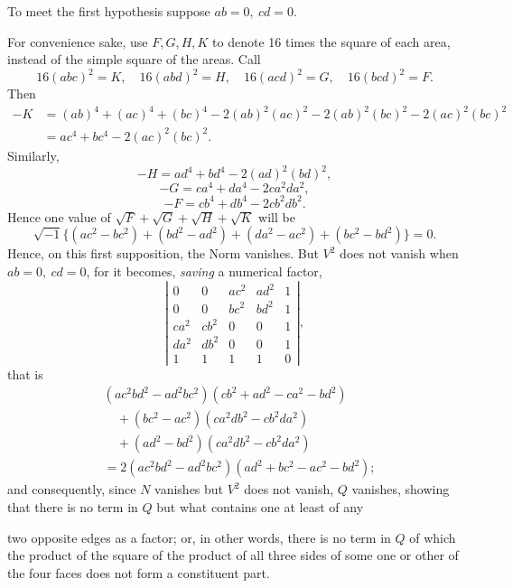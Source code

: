 \documentclass[11pt]{article}
\newcommand{\sourcepage}[1]{\marginpar{\scriptsize p.~#1}}
\begin{document}
{{To meet the first hypothesis suppose $ab=0,\ cd=0$.

For convenience sake, use $F,G,H,K$ to denote 16 times the square of each area, instead of the simple square of the areas. Call
\[
16(abc)^2=K,\quad 16(abd)^2=H,\quad 16(acd)^2=G,\quad 16(bcd)^2=F.
\]
Then
\[
\begin{aligned}
-K&=(ab)^4+(ac)^4+(bc)^4-2(ab)^2(ac)^2-2(ab)^2(bc)^2-2(ac)^2(bc)^2\\
&=ac^4+bc^4-2(ac)^2(bc)^2.
\end{aligned}
\]
Similarly,
\[
-H=ad^4+bd^4-2(ad)^2(bd)^2,
\]
\[
-G=ca^4+da^4-2ca^2da^2,
\]
\[
-F=cb^4+db^4-2cb^2db^2.
\]
Hence one value of $\sqrt F+\sqrt G+\sqrt H+\sqrt K$ will be
\[
\sqrt{-1}\{(ac^2-bc^2)+(bd^2-ad^2)+(da^2-ac^2)+(bc^2-bd^2)\}=0.
\]
Hence, on this first supposition, the Norm vanishes. But $V^2$ does not vanish when $ab=0,\ cd=0$, for it becomes, \emph{saving} a numerical factor,
\[
\left|\begin{array}{ccccc}
0&0&ac^2&ad^2&1\\
0&0&bc^2&bd^2&1\\
ca^2&cb^2&0&0&1\\
da^2&db^2&0&0&1\\
1&1&1&1&0
\end{array}\right|,
\]
that is
\[
\begin{aligned}
&(ac^2bd^2-ad^2bc^2)(cb^2+ad^2-ca^2-bd^2)\\
&\quad +(bc^2-ac^2)(ca^2db^2-cb^2da^2)\\
&\quad +(ad^2-bd^2)(ca^2db^2-cb^2da^2)\\
&=2(ac^2bd^2-ad^2bc^2)(ad^2+bc^2-ac^2-bd^2);
\end{aligned}
\]
and consequently, since $N$ vanishes but $V^2$ does not vanish, $Q$ vanishes, showing that there is no term in $Q$ but what contains one at least of any

\sourcepage{407}
two opposite edges as a factor; or, in other words, there is no term in $Q$ of which the product of the square of the product of all three sides of some one or other of the four faces does not form a constituent part.

}}
\end{document}
